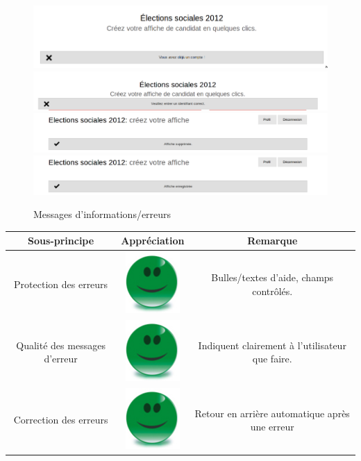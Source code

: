 \documentclass{article}
\begin{document}
\begin{sffamily}
\begin{figure}[h!]
	\begin{center}
		\includegraphics[scale=0.3]{ergo_010.png}
		\includegraphics[scale=0.2]{ergo_013.png}
		\includegraphics[scale=0.225]{ergo_014.png}		
		\includegraphics[scale=0.225]{ergo_015.png}
		\caption{Messages d'informations/erreurs}
	\end{center}
\end{figure}

\begin{center}
\begin{tabular}{c|c|c}
\textbf{Sous-principe} & \textbf{Appréciation} & \textbf{Remarque} \\
\hline
Protection des erreurs & \includegraphics[scale=0.27]{good.png} & Bulles/textes d'aide, champs contrôlés. \\
\hline
Qualité des messages d'erreur & \includegraphics[scale=0.27]{good.png} & Indiquent clairement à l'utilisateur que faire. \\
\hline
Correction des erreurs & \includegraphics[scale=0.27]{good.png} & Retour en arrière automatique après une erreur \\
\end{tabular}
\end{center}


\end{sffamily}
\end{document}
